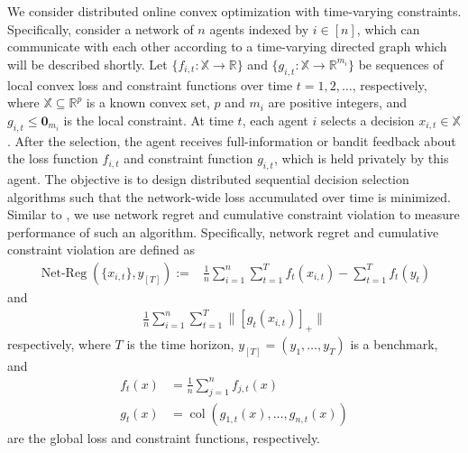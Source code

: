 \documentclass[12pt,draftcls,onecolumn]{IEEEtran}%
\DeclareMathOperator{\NetReg}{Net-Reg}
\DeclareMathOperator{\col}{col}
\begin{document}
We consider distributed online convex optimization with time-varying constraints. Specifically, consider a network of $n$ agents indexed by $i\in[n]$, which can communicate with each other according to a time-varying directed graph which will be described shortly. Let $\{f_{i,t}:\mathbb{X}\rightarrow \mathbb{R}\}$ and $\{g_{i,t}:\mathbb{X}\rightarrow \mathbb{R}^{m_i}\}$ be sequences of local convex loss and constraint functions over time $t=1,2,\dots$, respectively, where $\mathbb{X}\subseteq\mathbb{R}^p$ is a known convex set, $p$ and $m_i$ are positive integers, and $g_{i,t}\le{\bm 0}_{m_i}$ is the local constraint. At time $t$, each agent $i$ selects a decision $x_{i,t}\in \mathbb{X}$. After the selection, the agent receives full-information or bandit feedback about the loss function $f_{i,t}$ and constraint function $g_{i,t}$, which is held privately by this agent. 
The objective is to design distributed sequential decision selection algorithms such that the network-wide loss accumulated over time is minimized. Similar to \cite{yuan2017adaptive,yuan2021distributed,yuan2021distributedb,sharma2020distributed}, we use network regret and cumulative constraint violation to measure performance of such an algorithm. Specifically, network regret and cumulative constraint violation are defined as
\begin{align}\label{online_op:reg}
	\NetReg(\{x_{i,t}\},y_{[T]})
	:=&\frac{1}{n}\sum_{i=1}^{n}\sum_{t=1}^{T}f_t(x_{i,t})-\sum_{t=1}^{T}f_t(y_{t})
\end{align}
and
\begin{align}\label{online_op:regc}
	\frac{1}{n}\sum_{i=1}^n\sum_{t=1}^T\|[g_{t}(x_{i,t})]_+\|
\end{align}
respectively, where $T$ is the time horizon, $y_{[T]}=(y_{1},\dots,y_{T})$ is a  benchmark, and
\begin{align}
	f_t(x)&=\frac{1}{n}\sum_{j=1}^nf_{j,t}(x)\label{online_op:ft}\\
	g_t(x)&=\col(g_{1,t}(x),\dots,g_{n,t}(x))\label{online_op:gt}
\end{align}
are the global loss and constraint functions, respectively.
\end{document}
